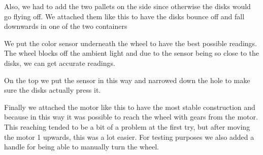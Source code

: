 Also, we had to add the two pallets on the side since otherwise the disks would go flying off. We attached them like this to have the disks bounce off and fall downwards in one of the two containers

We put the color sensor underneath the wheel to have the best possible readings. The wheel blocks off the ambient light and due to the sensor being so close to the disks, we can get accurate readings.

On the top we put the sensor in this way and narrowed down the hole to make sure the disks actually press it. 

Finally we attached the motor like this to have the most stable construction and because in this way it was possible to reach the wheel with gears from the motor. This reaching tended to be a bit of a problem at the first try, but after moving the motor 1 upwards, this was a lot easier. For testing purposes we also added a handle for being able to manually turn the wheel.
